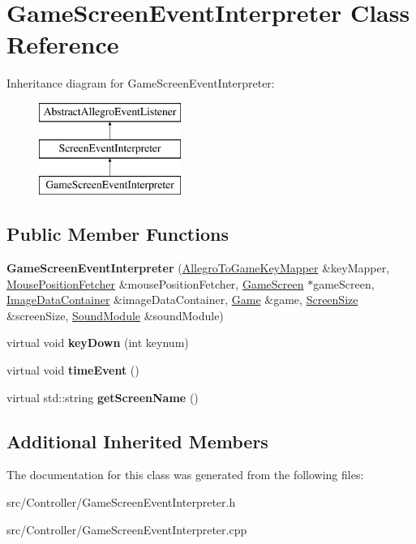 \hypertarget{classGameScreenEventInterpreter}{}\section{Game\+Screen\+Event\+Interpreter Class Reference}
\label{classGameScreenEventInterpreter}
Inheritance diagram for Game\+Screen\+Event\+Interpreter\+:\begin{figure}[H]
\begin{center}
\leavevmode
\includegraphics[height=3.000000cm]{classGameScreenEventInterpreter}
\end{center}
\end{figure}
\subsection*{Public Member Functions}
\begin{DoxyCompactItemize}
\item 
{\bfseries Game\+Screen\+Event\+Interpreter} (\hyperlink{classAllegroToGameKeyMapper}{Allegro\+To\+Game\+Key\+Mapper} \&key\+Mapper, \hyperlink{classMousePositionFetcher}{Mouse\+Position\+Fetcher} \&mouse\+Position\+Fetcher, \hyperlink{classGameScreen}{Game\+Screen} $\ast$game\+Screen, \hyperlink{classImageDataContainer}{Image\+Data\+Container} \&image\+Data\+Container, \hyperlink{classGame}{Game} \&game, \hyperlink{classScreenSize}{Screen\+Size} \&screen\+Size, \hyperlink{classSoundModule}{Sound\+Module} \&sound\+Module)\hypertarget{classGameScreenEventInterpreter_ae0b336acc8050ff68449dbf38f974bca}{}\label{classGameScreenEventInterpreter_ae0b336acc8050ff68449dbf38f974bca}

\item 
virtual void {\bfseries key\+Down} (int keynum)\hypertarget{classGameScreenEventInterpreter_a651b8768c75478fa88a5528bf1fe8a1e}{}\label{classGameScreenEventInterpreter_a651b8768c75478fa88a5528bf1fe8a1e}

\item 
virtual void {\bfseries time\+Event} ()\hypertarget{classGameScreenEventInterpreter_a1ac9277ffbcbbce67e6482a9f58f0648}{}\label{classGameScreenEventInterpreter_a1ac9277ffbcbbce67e6482a9f58f0648}

\item 
virtual std\+::string {\bfseries get\+Screen\+Name} ()\hypertarget{classGameScreenEventInterpreter_aa23b48d1b4f96bb1ad1b8a0adb42bf0f}{}\label{classGameScreenEventInterpreter_aa23b48d1b4f96bb1ad1b8a0adb42bf0f}

\end{DoxyCompactItemize}
\subsection*{Additional Inherited Members}


The documentation for this class was generated from the following files\+:\begin{DoxyCompactItemize}
\item 
src/\+Controller/Game\+Screen\+Event\+Interpreter.\+h\item 
src/\+Controller/Game\+Screen\+Event\+Interpreter.\+cpp\end{DoxyCompactItemize}
